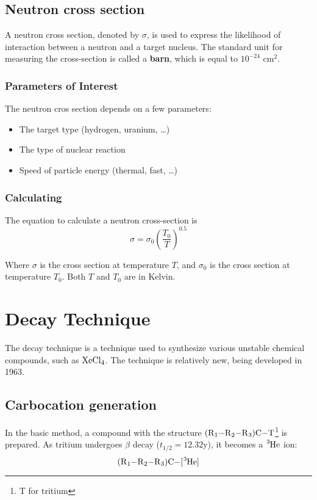 \documentclass{article}
\begin{document}
\begin{multicols*}{2}
    \subsection{Neutron cross section}
    A neutron cross section, denoted by $\sigma$, is used to express the likelihood
    of interaction between a neutron and a target nucleus. The standard unit for
    measuring the cross-section is called a \textbf{barn}, which is equal to
    $10^{-24}$ cm$^{2}$.

    \subsubsection{Parameters of Interest}
    The neutron cros section depends on a few parameters:
    \begin{itemize}
      \item The target type (hydrogen, uranium, \ldots)
      \item The type of nuclear reaction
      \item Speed of particle energy (thermal, fast, \ldots)
    \end{itemize}
    \subsubsection{Calculating}
    The equation to calculate a neutron cross-section is
    \[
      \sigma = \sigma_{0}\left( \frac{T_0}{T} \right)^{0.5}
    \]

    Where $\sigma$ is the cross section at temperature $T$, and $\sigma_0$ is
    the cross section at temperature $T_0$. Both $T$ and $T_0$ are in Kelvin.


    \section{Decay Technique}
    The decay technique is a technique used to synthesize various unstable chemical
    compounds, such as $\ce{XeCl4}$. The technique is relatively new, being developed
    in 1963.

    \subsection{Carbocation generation}
    In the basic method, a compound with the structure $\ce{(R1-R2-R3)C-T}$\footnote{T for tritium}
    is prepared. As tritium undergoes $\beta$ decay ($t_{1/2} = 12.32$y), it becomes
    a $\ce{^{3}He}$ ion:
    \[
      \ce{(R1-R2-R3)C-[^{3}He]}
    \]


\end{multicols*}
\end{document}
